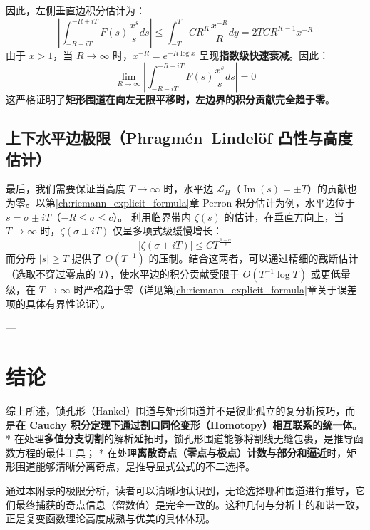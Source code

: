 因此，左侧垂直边积分估计为：
\begin{equation}
    \left| \int_{-R-iT}^{-R+iT} F(s) \frac{x^s}{s} ds \right| \le \int_{-T}^{T} C R^K \frac{x^{-R}}{R} dy = 2T C R^{K-1} x^{-R}
\end{equation}
由于 $x > 1$，当 $R \to \infty$ 时，$x^{-R} = e^{-R \log x}$ 呈现\textbf{指数级快速衰减}。因此：
\begin{equation}
    \lim_{R\to\infty} \left| \int_{-R-iT}^{-R+iT} F(s) \frac{x^s}{s} ds \right| = 0
\end{equation}
这严格证明了\textbf{矩形围道在向左无限平移时，左边界的积分贡献完全趋于零}。

\subsection{上下水平边极限（Phragmén--Lindelöf 凸性与高度估计）}

最后，我们需要保证当高度 $T \to \infty$ 时，水平边 $\mathcal{L}_H$（$\operatorname{Im}(s) = \pm T$）的贡献也为零。以第\ref{ch:riemann_explicit_formula}章 Perron 积分估计为例，水平边位于 $s = \sigma \pm iT$（$-R \le \sigma \le c$）。
利用临界带内 $\zeta(s)$ 的估计，在垂直方向上，当 $T \to \infty$ 时，$\zeta(\sigma \pm iT)$ 仅呈多项式级缓慢增长：
\[
  |\zeta(\sigma \pm iT)| \le C T^{\frac{1-\sigma}{2}}
\]
而分母 $|s| \ge T$ 提供了 $O(T^{-1})$ 的压制。结合这两者，可以通过精细的截断估计（选取不穿过零点的 $T$），使水平边的积分贡献受限于 $O(T^{-1} \log T)$ 或更低量级，在 $T \to \infty$ 时严格趋于零（详见第\ref{ch:riemann_explicit_formula}章关于误差项的具体有界性论证）。

---

\section{结论}

综上所述，锁孔形（Hankel）围道与矩形围道并不是彼此孤立的复分析技巧，而是\textbf{在 Cauchy 积分定理下通过割口同伦变形（Homotopy）相互联系的统一体}。
* 在处理\textbf{多值分支切割}的解析延拓时，锁孔形围道能够将割线无缝包裹，是推导函数方程的最佳工具；
* 在处理\textbf{离散奇点（零点与极点）计数与部分和逼近}时，矩形围道能够清晰分离奇点，是推导显式公式的不二选择。

通过本附录的极限分析，读者可以清晰地认识到，无论选择哪种围道进行推导，它们最终捕获的奇点信息（留数值）是完全一致的。这种几何与分析上的和谐一致，正是复变函数理论高度成熟与优美的具体体现。


